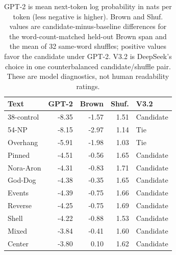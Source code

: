 \begin{table}[t]
\centering\small
\setlength{\tabcolsep}{1pt}
\begin{tabular}{@{}lrrrl@{}}
\toprule
Text & GPT-2 & Brown & Shuf. & V3.2 \\
\midrule
38-control & -8.35 & -1.57 & 1.51 & Candidate \\
54-NP & -8.15 & -2.97 & 1.14 & Tie \\
Overhang & -5.91 & -1.98 & 1.03 & Tie \\
Pinned & -4.51 & -0.56 & 1.65 & Candidate \\
Nora-Aron & -4.31 & -0.83 & 1.71 & Candidate \\
God-Dog & -4.38 & -0.35 & 1.65 & Candidate \\
Events & -4.39 & -0.75 & 1.66 & Candidate \\
Reverse & -4.25 & -0.75 & 1.69 & Candidate \\
Shell & -4.22 & -0.88 & 1.53 & Candidate \\
Mixed & -3.84 & -0.41 & 1.60 & Candidate \\
Center & -3.80 & 0.10 & 1.62 & Candidate \\
\bottomrule
\end{tabular}
\caption{GPT-2 is mean next-token log probability in nats per token (less negative is higher). Brown and Shuf. values are candidate-minus-baseline differences for the word-count-matched held-out Brown span and the mean of 32 same-word shuffles; positive values favor the candidate under GPT-2. V3.2 is DeepSeek's choice in one counterbalanced candidate/shuffle pair. These are model diagnostics, not human readability ratings.}
\label{tab:static-language-verifier}
\end{table}
